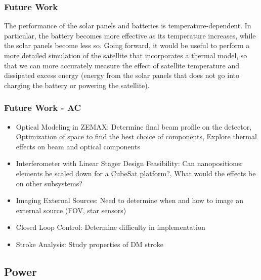 \documentclass[12pt]{article}
\begin{document}
			\subsubsection{Future Work}
The performance of the solar panels and batteries is temperature-dependent.  In particular, the battery becomes more effective as its temperature increases, while the solar panels become less so.  Going forward, it would be useful to perform a more detailed simulation of the satellite that incorporates a thermal model, so that we can more accurately measure the effect of satellite temperature and dissipated excess energy (energy from the solar panels that does not go into charging the battery or powering the satellite).
		


			\subsubsection{Future Work - AC}

\begin{itemize}
\item{Optical Modeling in ZEMAX}: Determine final beam profile on the detector, Optimization of 
space to find the best choice of components, Explore thermal effects on beam and optical components

\item{Interferometer with Linear Stager Design Feasibility}: Can nanopositioner elements be scaled down for a CubeSat platform?, What would the effects be on other subsystems?

\item{Imaging External Sources}: Need to determine when and how to image an external source (FOV, star sensors)

\item{Closed Loop Control}: Determine difficulty in implementation

\item{Stroke Analysis}: Study properties of DM stroke

\end{itemize}


		\subsection{Power}

\end{document}
